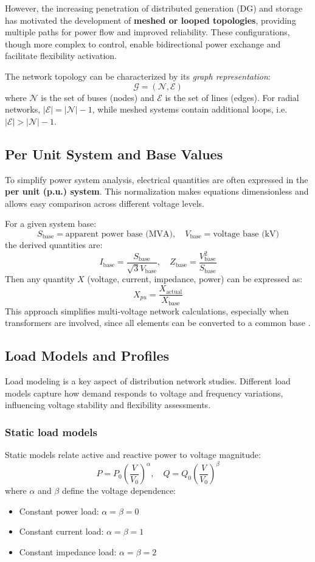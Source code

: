 \documentclass[11pt]{article}
\begin{document}
	However, the increasing penetration of distributed generation (DG) and storage has motivated the development of \textbf{meshed or looped topologies}, providing multiple paths for power flow and improved reliability.  
	These configurations, though more complex to control, enable bidirectional power exchange and facilitate flexibility activation.
	
	The network topology can be characterized by its \textit{graph representation}:
	\[
	\mathcal{G} = (\mathcal{N}, \mathcal{E})
	\]
	where $\mathcal{N}$ is the set of buses (nodes) and $\mathcal{E}$ is the set of lines (edges).  
	For radial networks, $|\mathcal{E}| = |\mathcal{N}| - 1$, while meshed systems contain additional loops, i.e. $|\mathcal{E}| > |\mathcal{N}| - 1$.
	
	\subsection{Per Unit System and Base Values}
	
	To simplify power system analysis, electrical quantities are often expressed in the \textbf{per unit (p.u.) system}.  
	This normalization makes equations dimensionless and allows easy comparison across different voltage levels.
	
	For a given system base:
	\[
	S_\text{base} = \text{apparent power base (MVA)}, \quad V_\text{base} = \text{voltage base (kV)}
	\]
	the derived quantities are:
	\[
	I_\text{base} = \frac{S_\text{base}}{\sqrt{3}V_\text{base}}, \quad Z_\text{base} = \frac{V_\text{base}^2}{S_\text{base}}
	\]
	Then any quantity $X$ (voltage, current, impedance, power) can be expressed as:
	\[
	X_{pu} = \frac{X_\text{actual}}{X_\text{base}}
	\]
	This approach simplifies multi-voltage network calculations, especially when transformers are involved, since all elements can be converted to a common base \cite{kundur1994power,grainger1994power}.
	
	\subsection{Load Models and Profiles}
	
	Load modeling is a key aspect of distribution network studies.  
	Different load models capture how demand responds to voltage and frequency variations, influencing voltage stability and flexibility assessments.
	
	\subsubsection*{Static load models}
	Static models relate active and reactive power to voltage magnitude:
	\[
	P = P_0 \left( \frac{V}{V_0} \right)^{\alpha}, \quad Q = Q_0 \left( \frac{V}{V_0} \right)^{\beta}
	\]
	where $\alpha$ and $\beta$ define the voltage dependence:
	\begin{itemize}
		\item Constant power load: $\alpha = \beta = 0$
		\item Constant current load: $\alpha = \beta = 1$
		\item Constant impedance load: $\alpha = \beta = 2$
	\end{itemize}
	
\end{document}
